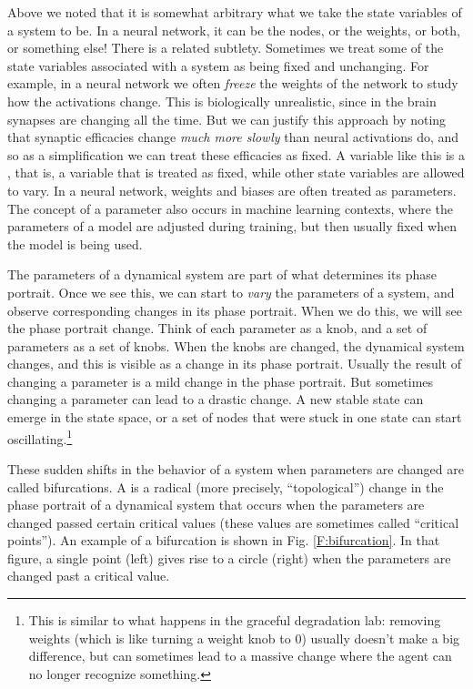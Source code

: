 Above we noted that it is somewhat arbitrary what we take the state variables of a system to be. In a neural network, it can be the nodes, or the weights, or both, or something else!   There is a related subtlety. Sometimes we treat some of the state variables associated with a system as being fixed and unchanging. For example, in a neural network we often \emph{freeze} the weights of the network to study how the activations change. This is biologically unrealistic, since in the brain synapses are changing all the time. But we can justify this approach by noting that synaptic efficacies change \emph{much more slowly} than neural activations do, and so as a simplification we can treat these efficacies as fixed.  A variable like this is a , that is, a variable that is treated as fixed, while other state variables are allowed to vary. In a neural network, weights and biases are often treated as parameters. The concept of a parameter also occurs in machine learning contexts, where the parameters of a model are adjusted during training, but then usually fixed when the model is being used.

The parameters of a dynamical system are part of what determines its phase portrait. Once we see this, we can start to \emph{vary} the parameters of a system, and observe corresponding changes in its phase portrait. When we do this, we will see the phase portrait change. Think of each parameter as a knob, and a set of parameters as a set of knobs. When the knobs are changed, the dynamical system changes, and this is visible as a change in its phase portrait. Usually the result of changing a parameter is a mild change in the phase portrait. But sometimes changing a parameter can lead to a drastic change. A new stable state can emerge in the state space, or a set of nodes that were stuck in one state can start oscillating.\footnote{This is similar to what happens in the graceful degradation lab: removing weights (which is like turning a weight knob to 0) usually doesn't make a big difference, but can sometimes lead to a massive change where the agent can no longer recognize something.} 

These sudden shifts in the behavior of a system when parameters are changed are called bifurcations. A  is a radical (more precisely, ``topological'') change in the phase portrait of a dynamical system that occurs when the parameters are changed passed certain critical values (these values are sometimes called ``critical points''). An example of a bifurcation is shown in Fig. \ref{F:bifurcation}. In that figure, a single point (left) gives rise to a circle (right) when the parameters are changed past a critical value.

